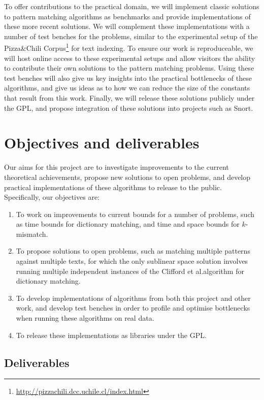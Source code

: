 \documentclass[a4paper,11pt]{article}
\begin{document}
    To offer contributions to the practical domain, we will implement classic solutions to pattern matching algorithms as benchmarks and provide implementations of these more recent solutions. We will complement these implementations with a number of test benches for the problems, similar to the experimental setup of the Pizza\&Chili Corpus\footnote{\url{http://pizzachili.dcc.uchile.cl/index.html}} for text indexing. To ensure our work is reproduceable, we will host online access to these experimental setups and allow visitors the ability to contribute their own solutions to the pattern matching problems. Using these test benches will also give us key insights into the practical bottlenecks of these algorithms, and give us ideas as to how we can reduce the size of the constants that result from this work. Finally, we will release these solutions publicly under the GPL, and propose integration of these solutions into projects such as Snort.

    \section{Objectives and deliverables}

    Our aims for this project are to investigate improvements to the current theoretical achievements, propose new solutions to open problems, and develop practical implementations of these algorithms to release to the public. Specifically, our objectives are:

    \begin{enumerate}
        \item To work on improvements to current bounds for a number of problems, such as time bounds for dictionary matching, and time and space bounds for $k$-mismatch.
        \item To propose solutions to open problems, such as matching multiple patterns against multiple texts, for which the only sublinear space solution involves running multiple independent instances of the Clifford et al.\@ algorithm for dictionary matching.
        \item To develop implementations of algorithms from both this project and other work, and develop test benches in order to profile and optimise bottlenecks when running these algorithms on real data.
        \item To release these implementations as libraries under the GPL.
    \end{enumerate}

    \subsection{Deliverables}
\end{document}
